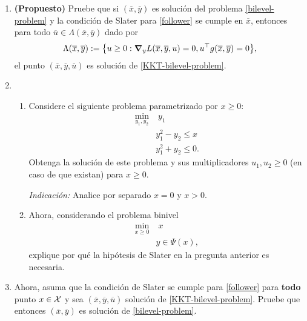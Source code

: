 \documentclass{article}
\begin{document}
\begin{enumerate}
	\item \textbf{(Propuesto)} Pruebe que si \((\overline{x}, \overline{y})\) es solución del problema \ref{bilevel-problem} y la condición de Slater para \ref{follower} se cumple en \(\overline{x}\), entonces para todo \(\overline{u} \in \Lambda(\overline{x}, \overline{y})\) dado por
		\[\Lambda(\overline{x}, \overline{y}) := \qty{ u \geq 0 : \grad_y L(\overline{x}, \overline{y}, u) = 0, u^\top g(\overline{x}, \overline{y}) = 0},\]
		el punto \((\overline{x}, \overline{y}, \overline{u})\) es solución de \ref{KKT-bilevel-problem}.
	\item
		\begin{enumerate}
			\item Considere el siguiente problema parametrizado por \(x \geq 0\):
				\begin{align*}
					\min_{y_1, y_2} & \;y_1 \\
									& y_1^2 - y_2 \leq x \\
									& y_1^2 + y_2 \leq 0.
				\end{align*}
			Obtenga la solución de este problema y sus multiplicadores \(u_1, u_2 \geq 0\) (en caso de que existan) para \(x \geq 0.\)

			\textit{Indicación:} Analice por separado \(x = 0\) y \(x > 0\).
		\item Ahora, considerando el problema binivel
			\begin{align*}
				\min_{x \geq 0} & \;x \\
								& y \in \Psi(x),
			\end{align*}
			explique por qué la hipótesis de Slater en la pregunta anterior es necesaria.
		\end{enumerate}
	\item Ahora, asuma que la condición de Slater se cumple para \ref{follower} para \textbf{todo} punto \(x \in \mathcal{X}\) y sea \((\overline{x}, \overline{y}, \overline{u})\) solución de \ref{KKT-bilevel-problem}. Pruebe que entonces \((\overline{x}, \overline{y})\) es solución de \ref{bilevel-problem}.
\end{enumerate}
\end{document}
